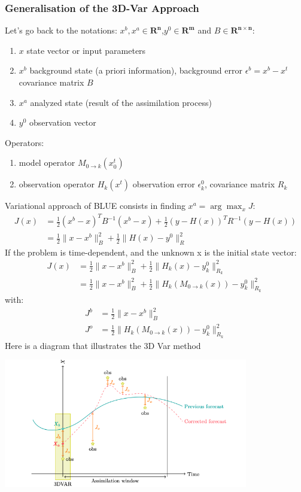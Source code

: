 \subsubsection{Generalisation of the 3D-Var Approach}
\noindent Let's go back to the notations:
\noindent  $x^b ,x^a\in \mathbf{R^n}$,$y^0 \in \mathbf{R^m} $ and $B \in \mathbf{R^{n\times n}}$:
 \begin{enumerate}[label=\textbullet]
		\item $x$ state vector or input parameters
		\item $x^{b}$ background state (a priori information), background  error $\epsilon^b=x^b-x^t$ covariance matrix $B$
		\item $x^{a}$ analyzed state (result of the assimilation process)
		\item $y^0$ observation vector
	\end{enumerate}
\noindent Operators:
    \begin{enumerate}[label=\textbullet]
		\item model operator $M_{0 \rightarrow k}(x_0^t)$
		\item observation operator $H_k(x^t)$ observation error $\epsilon_k^0$, covariance matrix $R_k$
	\end{enumerate}
\noindent Variational approach of BLUE consists in finding $x^a=\arg\max_{x}J$:
$$\begin{aligned}
J(x)&=\frac{1}{2}(x^b-x)^TB^{-1}(x^b-x)+\frac{1}{2}(y-H(x))^TR^{-1}(y-H(x)) \\
&=\frac{1}{2}\|x-x^b\|_B^2+\frac{1}{2}\|H(x)-y^0\|_R^2
\end{aligned}$$
If the problem is time-dependent, and the unknown x is the initial state vector:
$$\begin{aligned}
J(x)&=\frac{1}{2}\|x-x^b\|_B^2+\frac{1}{2}\|H_k(x)-y_k^0\|_{R_{k}}^2 \\
&=\frac{1}{2}\|x-x^b\|_B^2+\frac{1}{2}\|H_k(M_{0 \rightarrow k}(x))-y_k^0\|_{R_{k}}^2
\end{aligned}$$
with:
$$\begin{aligned}
J^b&=\frac{1}{2}\|x-x^b\|_B^2\\
J^o&=\frac{1}{2}\|H_k(M_{0 \rightarrow k}(x))-y_k^0\|_{R_{k}}^2
\end{aligned}$$
\vspace*{5mm}
Here is a diagram that illustrates the 3D Var method 
\begin{center}
		\includegraphics[width=0.8\textwidth]{"images/schema_3D_Var.png"}
	\end{center}
